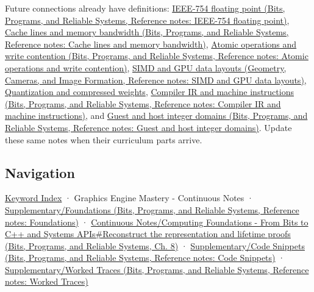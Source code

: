 Future connections already have definitions: \href{../01-Bits-Programs-and-Reliable-Systems/main.pdf\#nameddest=appendix-343615f49ddf}{IEEE-754 floating point (Bits, Programs, and Reliable Systems, Reference notes: IEEE-754 floating point)}, \href{../01-Bits-Programs-and-Reliable-Systems/main.pdf\#nameddest=appendix-e4ccdbab8320}{Cache lines and memory bandwidth (Bits, Programs, and Reliable Systems, Reference notes: Cache lines and memory bandwidth)}, \href{../01-Bits-Programs-and-Reliable-Systems/main.pdf\#nameddest=appendix-e12d1b03fefb}{Atomic operations and write contention (Bits, Programs, and Reliable Systems, Reference notes: Atomic operations and write contention)}, \href{../03-Geometry-Cameras-and-Image-Formation/main.pdf\#nameddest=appendix-3c7b1a56de01}{SIMD and GPU data layouts (Geometry, Cameras, and Image Formation, Reference notes: SIMD and GPU data layouts)}, \hyperref[appendix-fdc7879e8bf2]{Quantization and compressed weights}, \href{../01-Bits-Programs-and-Reliable-Systems/main.pdf\#nameddest=appendix-942ad41afb30}{Compiler IR and machine instructions (Bits, Programs, and Reliable Systems, Reference notes: Compiler IR and machine instructions)}, and \href{../01-Bits-Programs-and-Reliable-Systems/main.pdf\#nameddest=appendix-33e7a011b684}{Guest and host integer domains (Bits, Programs, and Reliable Systems, Reference notes: Guest and host integer domains)}. Update these same notes when their curriculum parts arrive.

\subsection{Navigation}\label{appendix-4ad47bdd269a-navigation}

\hyperref[appendix-a6d556a4ef50]{Keyword Index} · {Graphics Engine Mastery - Continuous Notes} · \href{../01-Bits-Programs-and-Reliable-Systems/main.pdf\#nameddest=appendix-fd090d982a15}{Supplementary/Foundations (Bits, Programs, and Reliable Systems, Reference notes: Foundations)} · \href{../01-Bits-Programs-and-Reliable-Systems/main.pdf\#nameddest=01-foundations-i-ch010-reconstruct-the-representation-and-lifetime-proofs}{Continuous Notes/Computing Foundations - From Bits to C++ and Systems APIs\#Reconstruct the representation and lifetime proofs (Bits, Programs, and Reliable Systems, Ch. 8)} · \href{../01-Bits-Programs-and-Reliable-Systems/main.pdf\#nameddest=appendix-4e2236f53445}{Supplementary/Code Snippets (Bits, Programs, and Reliable Systems, Reference notes: Code Snippets)} · \href{../01-Bits-Programs-and-Reliable-Systems/main.pdf\#nameddest=appendix-92ff77d4dfdc}{Supplementary/Worked Traces (Bits, Programs, and Reliable Systems, Reference notes: Worked Traces)}

